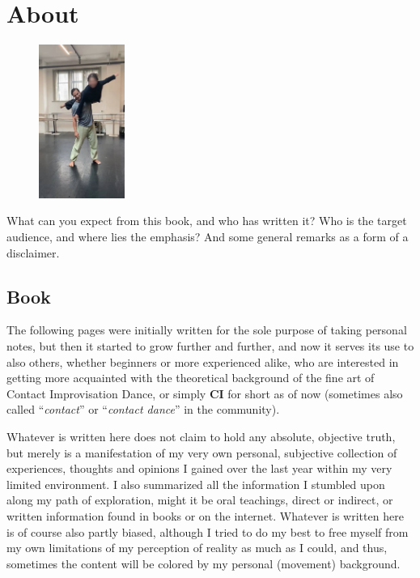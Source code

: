 \section{About}\label{sec:about}

\begin{figure}
\centering
\includegraphics[width=0.25\textwidth]{images/about}
\end{figure}

What can you expect from this book, and who has written it?
Who is the target audience, and where lies the emphasis?
And some general remarks as a form of a disclaimer.

\subsection{Book}\label{subsec:book}

The following pages were initially written for the sole purpose of taking personal notes, but then it started to grow further and further, and now it serves its use to also others, whether beginners or more experienced alike, who are interested in getting more acquainted with the theoretical background of the fine art of Contact Improvisation Dance, or simply \textbf{CI} for short as of now (sometimes also called ``\textit{contact}'' or ``\textit{contact dance}'' in the community).

Whatever is written here does not claim to hold any absolute, objective truth, but merely is a manifestation of my very own personal, subjective collection of experiences, thoughts and opinions I gained over the last year within my very limited environment.
I also summarized all the information I stumbled upon along my path of exploration, might it be oral teachings, direct or indirect, or written information found in books or on the internet.
Whatever is written here is of course also partly biased, although I tried to do my best to free myself from my own limitations of my perception of reality as much as I could, and thus, sometimes the content will be colored by my personal (movement) background.

